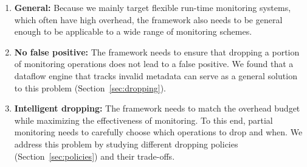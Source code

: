 \begin{enumerate}
  \item \textbf{General:} Because we mainly target flexible run-time monitoring systems,
  which often have high overhead, the framework also needs to be general enough to be
  applicable to a wide range of monitoring schemes.

  \item \textbf{No false positive:} The framework needs to ensure that dropping a portion
  of monitoring operations does not lead to a false positive. We found that a dataflow engine
  that tracks invalid metadata can serve as a general solution to this problem 
  (Section~\ref{sec:dropping}).

  \item \textbf{Intelligent dropping:} The framework needs to match the overhead budget
  while maximizing the effectiveness of monitoring. To this end, partial 
  monitoring needs to carefully choose which operations to drop and when. We address this
  problem by studying different dropping policies (Section~\ref{sec:policies}) and their
  trade-offs.

\end{enumerate}

